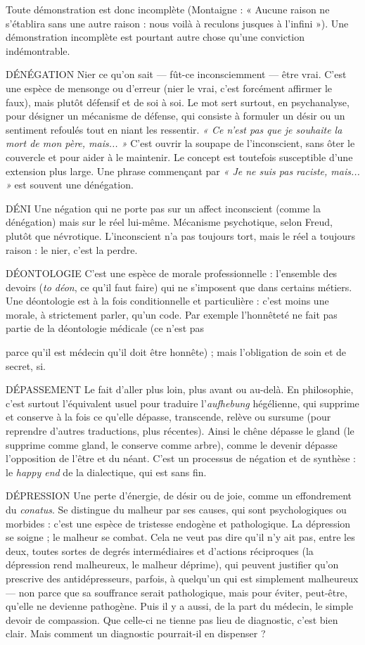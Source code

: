 Toute démonstration est donc incomplète (Montaigne : « Aucune raison
ne s’établira sans une autre raison : nous voilà à reculons jusques à l’infini »).
Une démonstration incomplète est pourtant autre chose qu’une conviction
indémontrable.

DÉNÉGATION Nier ce qu’on sait — fût-ce inconsciemment — être vrai.
C’est une espèce de mensonge ou d’erreur (nier le vrai,
c’est forcément affirmer le faux), mais plutôt défensif et de soi à soi. Le mot sert
surtout, en psychanalyse, pour désigner un mécanisme de défense, qui consiste
à formuler un désir ou un sentiment refoulés tout en niant les ressentir. {\it « Ce
n'est pas que je souhaite la mort de mon père, mais... »} C’est ouvrir la soupape de
l'inconscient, sans ôter le couvercle et pour aider à le maintenir. Le concept est
toutefois susceptible d’une extension plus large. Une phrase commençant par
{\it « Je ne suis pas raciste, mais... »} est souvent une dénégation.

DÉNI Une négation qui ne porte pas sur un affect inconscient (comme la
dénégation) mais sur le réel lui-même. Mécanisme psychotique,
selon Freud, plutôt que névrotique. L’inconscient n’a pas toujours tort, mais le
réel a toujours raison : le nier, c’est la perdre.

DÉONTOLOGIE C’est une espèce de morale professionnelle : l’ensemble
des devoirs ({\it to déon}, ce qu’il faut faire) qui ne s'imposent
que dans certains métiers. Une déontologie est à la fois conditionnelle et
particulière : c’est moins une morale, à strictement parler, qu’un code. Par
exemple l'honnêteté ne fait pas partie de la déontologie médicale (ce n’est pas

parce qu’il est médecin qu’il doit être honnête) ; mais l’obligation de soin et de
secret, si.

DÉPASSEMENT Le fait d’aller plus loin, plus avant ou au-delà. En philosophie,
c’est surtout l'équivalent usuel pour traduire
l'{\it aufhebung} hégélienne, qui supprime et conserve à la fois ce qu’elle dépasse,
transcende, relève ou sursume (pour reprendre d’autres traductions, plus
récentes). Ainsi le chêne dépasse le gland (le supprime comme gland, le
conserve comme arbre), comme le devenir dépasse l’opposition de l'être et du
néant. C’est un processus de négation et de synthèse : le {\it happy end} de la dialectique,
qui est sans fin.

DÉPRESSION Une perte d'énergie, de désir ou de joie, comme un effondrement
du {\it conatus}. Se distingue du malheur par ses causes,
qui sont psychologiques ou morbides : c’est une espèce de tristesse endogène et
pathologique. La dépression se soigne ; le malheur se combat. Cela ne veut pas
dire qu’il n’y ait pas, entre les deux, toutes sortes de degrés intermédiaires et
d’actions réciproques (la dépression rend malheureux, le malheur déprime), qui
peuvent justifier qu’on prescrive des antidépresseurs, parfois, à quelqu’un qui
est simplement malheureux — non parce que sa souffrance serait pathologique,
mais pour éviter, peut-être, qu’elle ne devienne pathogène. Puis il y a aussi, de
la part du médecin, le simple devoir de compassion. Que celle-ci ne tienne pas
lieu de diagnostic, c’est bien clair. Mais comment un diagnostic pourrait-il en
dispenser ?

